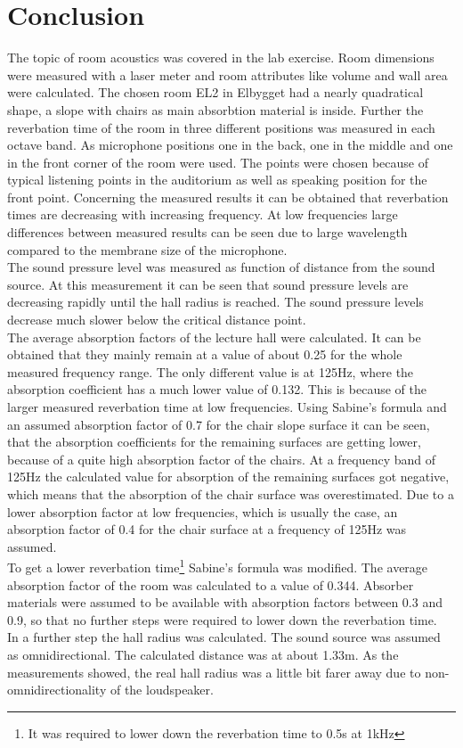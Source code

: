 \documentclass{article}
\begin{document}
\section{Conclusion}
The topic of room acoustics was covered in the lab exercise. Room dimensions were measured with a laser meter and room attributes like volume and wall area were calculated. The chosen room EL2 in Elbygget had a nearly quadratical shape, a slope with chairs as main absorbtion material is inside. Further the reverbation time of the room in three different positions was measured in each octave band. As microphone positions one in the back, one in the middle and one in the front corner of the room were used. The points were chosen because of typical listening points in the auditorium as well as speaking position for the front point. Concerning the measured results it can be obtained that reverbation times are decreasing with increasing frequency. At low frequencies large differences between measured results can be seen due to large wavelength compared to the membrane size of the microphone.\\
The sound pressure level was measured as function of distance from the sound source. At this measurement it can be seen that sound pressure levels are decreasing rapidly until the hall radius is reached. The sound pressure levels decrease much slower below the critical distance point.\\
The average absorption factors of the lecture hall were calculated. It can be obtained that they mainly remain at a value of about 0.25 for the whole measured frequency range. The only different value is at 125Hz, where the absorption coefficient has a much lower value of 0.132. This is because of the larger measured reverbation time at low frequencies. Using Sabine's formula and an assumed absorption factor of 0.7 for the chair slope surface it can be seen, that the absorption coefficients for the remaining surfaces are getting lower, because of a quite high absorption factor of the chairs. At a frequency band of 125Hz the calculated value for absorption of the remaining surfaces got negative, which means that the absorption of the chair surface was overestimated. Due to a lower absorption factor at low frequencies, which is usually the case, an absorption factor of 0.4 for the chair surface at a frequency of 125Hz was assumed.\\
To get a lower reverbation time\footnote{It was required to lower down the reverbation time to 0.5s at 1kHz} Sabine's formula was modified. The average absorption factor of the room was calculated to a value of 0.344. Absorber materials were assumed to be available with absorption factors between 0.3 and 0.9, so that no further steps were required to lower down the reverbation time.\\
In a further step the hall radius was calculated. The sound source was assumed as omnidirectional. The calculated distance was at about 1.33m. As the measurements showed, the real hall radius was a little bit farer away due to non-omnidirectionality of the loudspeaker.
\newpage
\end{document}
